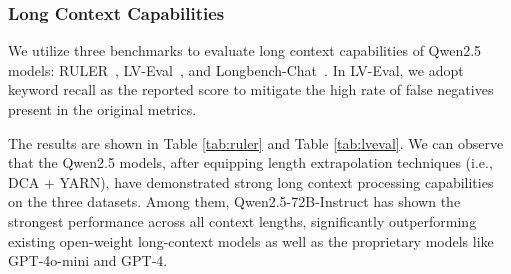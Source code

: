 \subsubsection{Long Context Capabilities}

We utilize three benchmarks to evaluate long context capabilities of Qwen2.5 models: RULER~\citep{hsieh2024ruler}, LV-Eval~\citep{yuan2024lveval}, and Longbench-Chat~\citep{longalign2024bai}. In LV-Eval, we adopt keyword recall as the reported score to mitigate the high rate of false negatives present in the original metrics.




The results are shown in Table \ref{tab:ruler} and Table \ref{tab:lveval}. We can observe that the Qwen2.5 models, after equipping length extrapolation techniques (i.e., DCA + YARN), have demonstrated strong long context processing capabilities on the three datasets. Among them, Qwen2.5-72B-Instruct has shown the strongest performance across all context lengths, significantly outperforming existing open-weight long-context models as well as the proprietary models like GPT-4o-mini and GPT-4.

